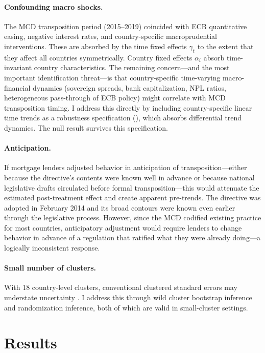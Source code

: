 \documentclass[12pt]{article}
\begin{document}
\paragraph{Confounding macro shocks.} The MCD transposition period (2015--2019) coincided with ECB quantitative easing, negative interest rates, and country-specific macroprudential interventions. These are absorbed by the time fixed effects $\gamma_t$ to the extent that they affect all countries symmetrically. Country fixed effects $\alpha_i$ absorb time-invariant country characteristics. The remaining concern---and the most important identification threat---is that country-specific time-varying macro-financial dynamics (sovereign spreads, bank capitalization, NPL ratios, heterogeneous pass-through of ECB policy) might correlate with MCD transposition timing. I address this directly by including country-specific linear time trends as a robustness specification (), which absorbs differential trend dynamics. The null result survives this specification.

\paragraph{Anticipation.} If mortgage lenders adjusted behavior in anticipation of transposition---either because the directive's contents were known well in advance or because national legislative drafts circulated before formal transposition---this would attenuate the estimated post-treatment effect and create apparent pre-trends. The directive was adopted in February 2014 and its broad contours were known even earlier through the legislative process. However, since the MCD codified existing practice for most countries, anticipatory adjustment would require lenders to change behavior in advance of a regulation that ratified what they were already doing---a logically inconsistent response.

\paragraph{Small number of clusters.} With 18 country-level clusters, conventional clustered standard errors may understate uncertainty \citep{mackinnon_2022_cluster}. I address this through wild cluster bootstrap inference and randomization inference, both of which are valid in small-cluster settings.


\section{Results}
\label{sec:results}
\end{document}

